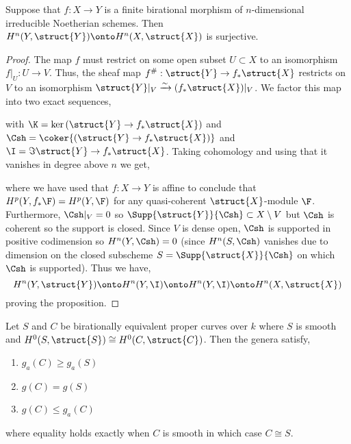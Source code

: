 \begin{lemma}
Suppose that $f : X \to Y$ is a finite birational morphism of $n$-dimensional irreducible Noetherian schemes. Then $H^n(Y, \struct{Y}) \onto H^n(X, \struct{X})$ is surjective.
\end{lemma}

\begin{proof}
The map $f$ must restrict on some open subset $U \subset X$ to an isomorphism $f|_U : U \to V$. Thus, the sheaf map $f^\# : \struct{Y} \to f_* \struct{X}$ restricts on $V$ to an isomorphism $\struct{Y}|_V \xrightarrow{\sim} (f_* \struct{X})|_V$. We factor this map into two exact sequences,
\begin{center}
\end{center}
with $\K = \ker{(\struct{Y} \to f_* \struct{X})}$ and $\Csh = \coker{(\struct{Y} \to f_* \struct{X})}$ and $\I = \Im{\struct{Y} \to f_* \struct{X}}$. Taking cohomology and using that it vanishes in degree above $n$ we get,
\begin{center}
\end{center}
where we have used that $f : X \to Y$ is affine to conclude that $H^p(Y, f_* \F) = H^p(Y, \F)$ for any quasi-coherent $\struct{X}$-module $\F$. Furthermore, $\Csh|_V = 0$ so $\Supp{\struct{Y}}{\Csh} \subset X \setminus V$ but $\Csh$ is coherent so the support is closed. Since $V$ is dense open, $\Csh$ is supported in positive codimension so $H^n(Y, \Csh) = 0$ (since $H^n(S, \Csh)$ vanishes due to dimension on the closed subscheme $S = \Supp{\struct{X}}{\Csh}$ on which $\Csh$ is supported). Thus we have,
\[ H^n(Y, \struct{Y}) \onto H^n(Y, \I) \onto H^n(Y, \I) \onto H^n(X, \struct{X}) \]
proving the proposition.
\end{proof}

\begin{lemma} \label{genus_formulas}
Let $S$ and $C$ be birationally equivalent proper curves over $k$ where $S$ is smooth and $H^0(S, \struct{S}) \cong H^0(C, \struct{C})$. Then the genera satisfy,
\begin{enumerate}
\item $g_a(C) \ge g_a(S)$
\item $g(C) = g(S)$
\item $g(C) \le g_a(C)$
\end{enumerate} 
where equality holds exactly when $C$ is smooth in which case $C \cong S$.
\end{lemma}

